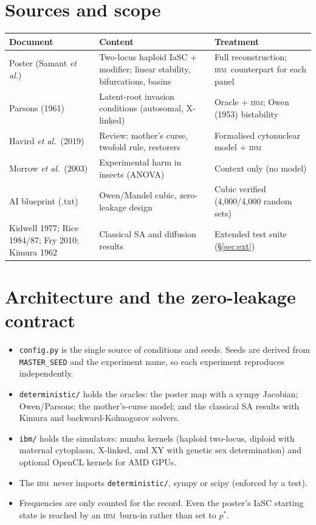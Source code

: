 \documentclass[11pt,a4paper]{article}
\newcommand{\IBM}{\textsc{ibm}}
\newcommand{\pstar}{p^{*}}
\begin{document}
\section{Sources and scope}
\begin{tabular}{p{4.6cm}p{5.2cm}p{5.6cm}}
\toprule
Document & Content & Treatment\\
\midrule
Poster (Samant \emph{et al.}) & Two-locus haploid IaSC + modifier; linear stability, bifurcations, basins & Full reconstruction; \IBM\ counterpart for each panel\\
Parsons (1961) & Latent-root invasion conditions (autosomal, X-linked) & Oracle + \IBM; Owen (1953) bistability\\
Havird \emph{et al.}\ (2019) & Review: mother's curse, twofold rule, restorers & Formalised cytonuclear model + \IBM\\
Morrow \emph{et al.}\ (2003) & Experimental harm in insects (ANOVA) & Context only (no model)\\
AI blueprint (.txt) & Owen/Mandel cubic, zero-leakage design & Cubic verified (4{,}000/4{,}000 random sets)\\
Kidwell 1977; Rice 1984/87; Fry 2010; Kimura 1962 & Classical SA and diffusion results & Extended test suite (\S\ref{sec:ext})\\
\bottomrule
\end{tabular}

\section{Architecture and the zero-leakage contract}
\begin{itemize}
\item \texttt{config.py} is the single source of conditions and seeds. Seeds are derived from \texttt{MASTER\_SEED} and the experiment name, so each experiment reproduces independently.
\item \texttt{deterministic/} holds the oracles: the poster map with a sympy Jacobian; Owen/Parsons; the mother's-curse model; and the classical SA results with Kimura and backward-Kolmogorov solvers.
\item \texttt{ibm/} holds the simulators: numba kernels (haploid two-locus, diploid with maternal cytoplasm, X-linked, and XY with genetic sex determination) and optional OpenCL kernels for AMD GPUs.
\item The \IBM\ never imports \texttt{deterministic/}, sympy or scipy (enforced by a test).
\item Frequencies are only counted for the record. Even the poster's IaSC starting state is reached by an \IBM\ burn-in rather than set to $\pstar$.
\end{itemize}
\end{document}
